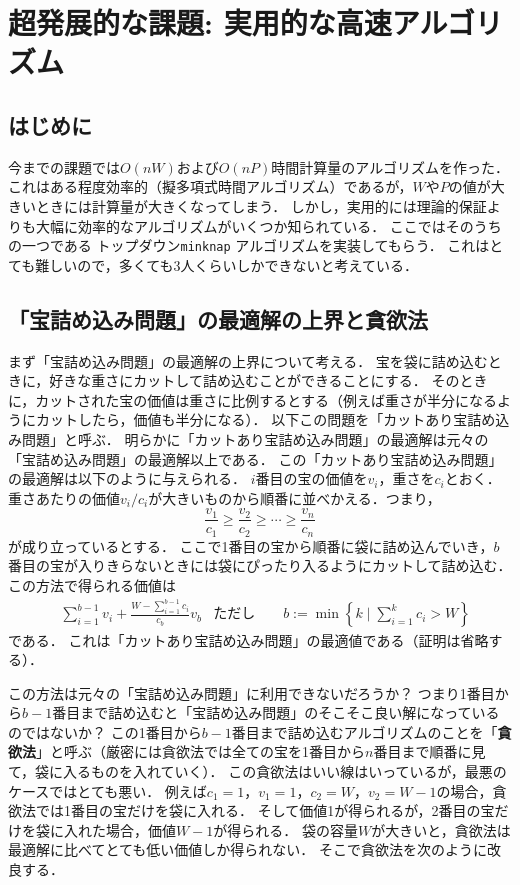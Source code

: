 \documentclass[a4paper,twoside,onecolumn,openany,article]{memoir}
\theoremstyle{remark}
\begin{document}
\section{超発展的な課題: 実用的な高速アルゴリズム}
\subsection{はじめに}
今までの課題では$O(nW)$および$O(nP)$時間計算量のアルゴリズムを作った．
これはある程度効率的（擬多項式時間アルゴリズム）であるが，$W$や$P$の値が大きいときには計算量が大きくなってしまう．
しかし，実用的には理論的保証よりも大幅に効率的なアルゴリズムがいくつか知られている．
ここではそのうちの一つである トップダウン\texttt{minknap} アルゴリズムを実装してもらう．
これはとても難しいので，多くても3人くらいしかできないと考えている．

\subsection{「宝詰め込み問題」の最適解の上界と貪欲法}
まず「宝詰め込み問題」の最適解の上界について考える．
宝を袋に詰め込むときに，好きな重さにカットして詰め込むことができることにする．
そのときに，カットされた宝の価値は重さに比例するとする（例えば重さが半分になるようにカットしたら，価値も半分になる）．
以下この問題を「カットあり宝詰め込み問題」と呼ぶ．
明らかに「カットあり宝詰め込み問題」の最適解は元々の「宝詰め込み問題」の最適解以上である．
この「カットあり宝詰め込み問題」の最適解は以下のように与えられる．
$i$番目の宝の価値を$v_i$，重さを$c_i$とおく．
重さあたりの価値$v_i/c_i$が大きいものから順番に並べかえる．つまり，
\begin{equation*}
\frac{v_1}{c_1}\ge
\frac{v_2}{c_2}\ge
\dotsb
\ge \frac{v_n}{c_n}
\end{equation*}
が成り立っているとする．
ここで1番目の宝から順番に袋に詰め込んでいき，$b$番目の宝が入りきらないときには袋にぴったり入るようにカットして詰め込む．
この方法で得られる価値は
\begin{align*}
&\sum_{i=1}^{b-1} v_i + \frac{W-\sum_{i=1}^{b-1} c_i}{c_b}v_b&
\text{ただし}\qquad b:= \min\left\{k\mid \sum_{i=1}^k c_i > W\right\}
\end{align*}
である．
これは「カットあり宝詰め込み問題」の最適値である（証明は省略する）．

この方法は元々の「宝詰め込み問題」に利用できないだろうか？
つまり1番目から$b-1$番目まで詰め込むと「宝詰め込み問題」のそこそこ良い解になっているのではないか？
この1番目から$b-1$番目まで詰め込むアルゴリズムのことを「\textbf{貪欲法}」と呼ぶ（厳密には貪欲法では全ての宝を1番目から$n$番目まで順番に見て，袋に入るものを入れていく）．
この貪欲法はいい線はいっているが，最悪のケースではとても悪い．
例えば$c_1=1$，$v_1=1$，$c_2=W$，$v_2=W-1$の場合，貪欲法では1番目の宝だけを袋に入れる．
そして価値1が得られるが，2番目の宝だけを袋に入れた場合，価値$W-1$が得られる．
袋の容量$W$が大きいと，貪欲法は最適解に比べてとても低い価値しか得られない．
そこで貪欲法を次のように改良する．
\end{document}
